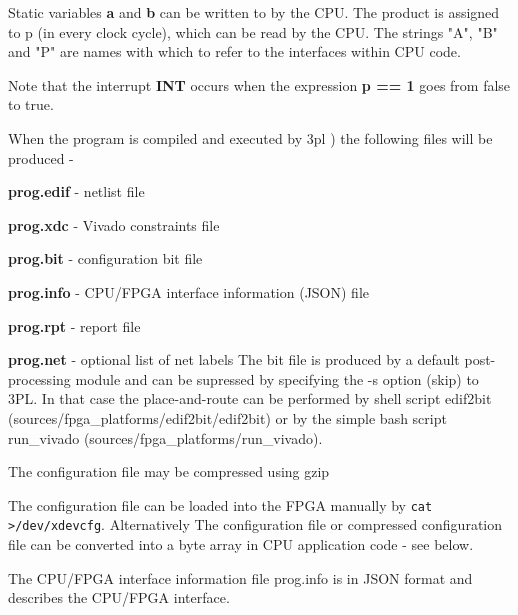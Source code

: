     Static variables {\bf a} and {\bf b} can be written to by the CPU. The
    product is assigned to p (in every clock cycle), which can be read by the
    CPU. The strings "A", "B" and "P" are names with which to refer to the
    interfaces within CPU code.
    
    Note that the interrupt {\bf INT} occurs when the expression
    {\bf p == 1} goes from false to true.
    
    When the program is compiled and executed by 3pl
    ) the following files will be produced -
    \blist
    \item   {\bf prog.edif} - netlist file
    \item   {\bf prog.xdc} - Vivado constraints file
    \item   {\bf prog.bit} - configuration bit file
    \item   {\bf prog.info} - CPU/FPGA interface information (JSON) file
    \item   {\bf prog.rpt} - report file
    \item   {\bf prog.net} - optional list of net labels
    \blend
    The bit file is produced by a default post-processing module and can be
    supressed by specifying the -s option (skip) to 3PL. In that case the
    place-and-route can be performed by shell script edif2bit
    (sources/fpga\_platforms/edif2bit/edif2bit) or by the simple bash script
    run\_vivado (sources/fpga\_platforms/run\_vivado).
    
    The configuration file may be compressed using gzip
    
    The configuration file can be loaded into the FPGA manually by
    \verb'cat >/dev/xdevcfg'. Alternatively The configuration file or compressed
    configuration file can be converted into a byte array in CPU application
    code - see below.
    
    The CPU/FPGA interface information file prog.info is in JSON format and
    describes the CPU/FPGA interface.
     
